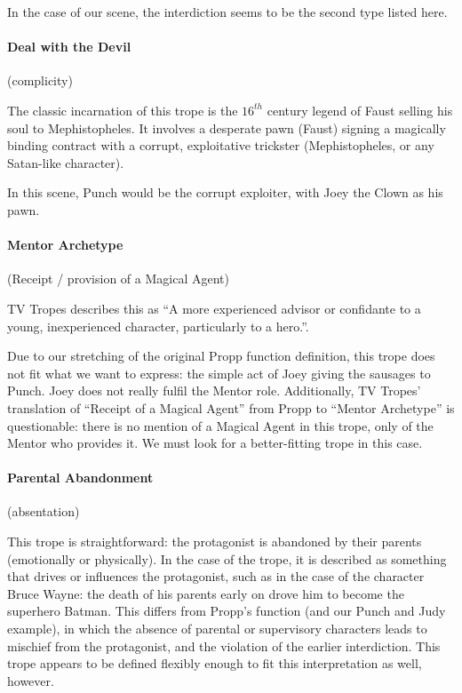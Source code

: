 \documentclass[11pt]{report}
\begin{document}
In the case of our scene, the interdiction seems to be the second type listed
here.

\paragraph{Deal with the Devil} (complicity)

The classic incarnation of this trope is the $16^{th}$ century legend of Faust
selling his soul to Mephistopheles. It involves a desperate pawn (Faust) signing
a magically binding contract with a corrupt, exploitative trickster
(Mephistopheles, or any Satan-like character).

In this scene, Punch would be the corrupt exploiter, with Joey the Clown as his pawn.

\paragraph{Mentor Archetype} (Receipt / provision of a Magical Agent)

TV Tropes describes this as ``A more experienced advisor or confidante to a
young, inexperienced character, particularly to a hero.''.

Due to our stretching of the original Propp function definition, this trope does
not fit what we want to express: the simple act of Joey giving the sausages to
Punch. Joey does not really fulfil the Mentor role. Additionally, TV Tropes'
translation of ``Receipt of a Magical Agent'' from Propp to ``Mentor Archetype''
is questionable: there is no mention of a Magical Agent in this trope, only of
the Mentor who provides it. We must look for a better-fitting trope in this case.

\paragraph{Parental Abandonment} (absentation)

This trope is straightforward: the protagonist is abandoned by their parents
(emotionally or physically). In the case of the trope, it is described as
something that drives or influences the protagonist, such as in the case of
the character Bruce Wayne: the death of his parents early on drove him to
become the superhero Batman. This differs from Propp's function (and our Punch
and Judy example), in which the absence of parental or supervisory characters
leads to mischief from the protagonist, and the violation of the earlier
interdiction. This trope appears to be defined flexibly enough to fit this
interpretation as well, however.
\end{document}
